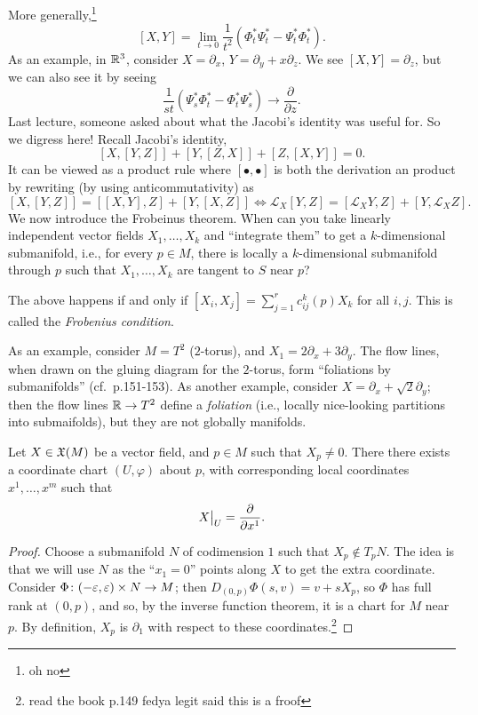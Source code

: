 More generally,\footnote{oh no}
\[ [X, Y] = \lim_{t \to 0} \frac{1}{t^2} \left(\Phi_t^\ast \Psi_t^\ast - \Psi_t^\ast \Phi_t^\ast\right). \]
As an example, in $\mathbb R^3$, consider $X = \partial_x$, $Y = \partial_y + x \partial_z$. We see $[X, Y] = \partial_z$, but we can also see it by seeing
\[ \frac{1}{st} \left(\Psi_s^\ast \Phi_t^\ast - \Phi_t^\ast \Psi_s^\ast\right) \to \frac{\partial}{\partial z}. \]
Last lecture, someone asked about what the Jacobi's identity was useful for. So we digress here! Recall Jacobi's identity,
\[ [X, [Y, Z]] + [Y, [Z, X]] + [Z, [X, Y]] = 0. \]
It can be viewed as a product rule where $[\bullet, \bullet]$ is both the derivation an product by rewriting (by using anticommutativity) as
\[ [X, [Y, Z]] = [[X, Y], Z] + [Y, [X, Z]] \iff \mathcal L_X[Y, Z] = [\mathcal L_X Y, Z] + [Y, \mathcal L_X Z]. \]
We now introduce the Frobeinus theorem. When can you take linearly independent vector fields $X_1, \dots, X_k$ and ``integrate them'' to get a $k$-dimensional submanifold, i.e., for every $p \in M$, there is locally a $k$-dimensional submanifold through $p$ such that $X_1, \dots, X_k$ are tangent to $S$ near $p$?
\begin{theorem}[Frobenius]
    The above happens if and only if $[X_i, X_j] = \sum_{j=1}^r c_{ij}^k(p) X_k$ for all $i, j$. This is called the \textit{Frobenius condition}.
\end{theorem}
As an example, consider $M = T^2$ ($2$-torus), and $X_1 = 2 \partial_x + 3 \partial_y$. The flow lines, when drawn on the gluing diagram for the $2$-torus, form ``foliations by submanifolds'' (cf.\ p.151-153). As another example, consider $X = \partial_x + \sqrt{2} \partial_y$; then the flow lines $\mathbb R \to T^2$ define a \textit{foliation} (i.e., locally nice-looking partitions into submaifolds), but they are not globally manifolds.
\begin{lemma}
    Let $X \in \mathfrak X(M)$ be a vector field, and $p \in M$ such that $X_p \neq 0$. There there exists a coordinate chart $(U, \varphi)$ about $p$, with corresponding local coordinates $x^1, \dots, x^m$ such that
    \[ \restr{X}{U} = \frac{\partial}{\partial x^1}. \]
\end{lemma}
\begin{proof}
    Choose a submanifold $N$ of codimension $1$ such that $X_p \notin T_p N$. The idea is that we will use $N$ as the ``$x_1 = 0$'' points along $X$ to get the extra coordinate. Consider $\Phi \colon (-\varepsilon, \varepsilon) \times N \to M$; then $D_{(0, p)} \Phi(s, v) = v + s X_p$, so $\Phi$ has full rank at $(0, p)$, and so, by the inverse function theorem, it is a chart for $M$ near $p$. By definition, $X_p$ is $\partial_1$ with respect to these coordinates.\footnote{read the book p.149 fedya legit said this is a froof}
\end{proof}
